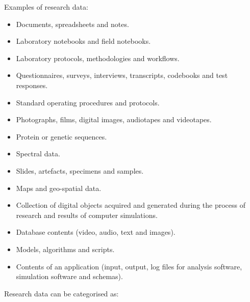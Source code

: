 \documentclass[
]{book}
\providecommand{\tightlist}{%
  \setlength{\itemsep}{0pt}\setlength{\parskip}{0pt}}
\begin{document}
Examples of research data:

\begin{itemize}
\tightlist
\item
  Documents, spreadsheets and notes.
\item
  Laboratory notebooks and field notebooks.
\item
  Laboratory protocols, methodologies and workflows.
\item
  Questionnaires, surveys, interviews, transcripts, codebooks and test responses.
\item
  Standard operating procedures and protocols.
\item
  Photographs, films, digital images, audiotapes and videotapes.
\item
  Protein or genetic sequences.
\item
  Spectral data.
\item
  Slides, artefacts, specimens and samples.
\item
  Maps and geo-spatial data.
\item
  Collection of digital objects acquired and generated during the process of research and results of computer simulations.
\item
  Database contents (video, audio, text and images).
\item
  Models, algorithms and scripts.
\item
  Contents of an application (input, output, log files for analysis software, simulation software and schemas).
\end{itemize}

Research data can be categorised as:
\end{document}
